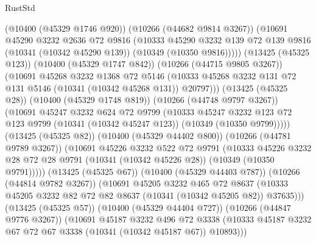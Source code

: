 \begin{lexlean}{RustStd}
\begin{coremodule}
                    (@10400 (@45329 @1746 @920))
                    (@10266 (@44682 @9814 @3267))
                    (@10691
                      @45290
                      @3232
                      @2636
                      @72
                      @9816
                      (@10333
                        @45290
                        @3232
                        @139
                        @72
                        @139
                        @9816
                        (@10341 (@10342 @45290 @139))
                        (@10349 (@10350 @9816)))))
                  (@13425 (@45325 @123))
                  (@10400 (@45329 @1747 @842))
                  (@10266 (@44715 @9805 @3267))
                  (@10691
                    @45268
                    @3232
                    @1368
                    @72
                    @5146
                    (@10333 @45268 @3232 @131 @72 @131 @5146 (@10341 (@10342 @45268 @131)) @20797)))
                (@13425 (@45325 @28))
                (@10400 (@45329 @1748 @819))
                (@10266 (@44748 @9797 @3267))
                (@10691
                  @45247
                  @3232
                  @624
                  @72
                  @9799
                  (@10333
                    @45247
                    @3232
                    @123
                    @72
                    @123
                    @9799
                    (@10341 (@10342 @45247 @123))
                    (@10349 (@10350 @9799)))))
              (@13425 (@45325 @82))
              (@10400 (@45329 @44402 @800))
              (@10266 (@44781 @9789 @3267))
              (@10691
                @45226
                @3232
                @522
                @72
                @9791
                (@10333
                  @45226
                  @3232
                  @28
                  @72
                  @28
                  @9791
                  (@10341 (@10342 @45226 @28))
                  (@10349 (@10350 @9791)))))
            (@13425 (@45325 @67))
            (@10400 (@45329 @44403 @787))
            (@10266 (@44814 @9782 @3267))
            (@10691
              @45205
              @3232
              @465
              @72
              @8637
              (@10333 @45205 @3232 @82 @72 @82 @8637 (@10341 (@10342 @45205 @82)) @37635)))
          (@13425 (@45325 @57))
          (@10400 (@45329 @44404 @727))
          (@10266 (@44847 @9776 @3267))
          (@10691
            @45187
            @3232
            @496
            @72
            @3338
            (@10333 @45187 @3232 @67 @72 @67 @3338 (@10341 (@10342 @45187 @67)) @10893)))

\end{coremodule}
\end{lexlean}
